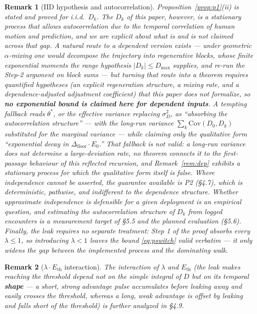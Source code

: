 \documentclass[11pt]{article}
\newtheorem{remark}{Remark}
\newcommand{\Dfloor}{\Delta_{\text{floor}}}
\newcommand{\Eth}{E_{\text{th}}}
\begin{document}
\begin{remark}[IID hypothesis and autocorrelation] \label{rem:iid}
Proposition~\ref{prop:p1}(ii) is stated and proved for i.i.d.\ $D_k$. The $D_k$ of this paper, however, is a stationary process that allows autocorrelation due to the temporal correlation of human motion and prediction, and we are explicit about what is and is not claimed across that gap. A natural route to a dependent version exists --- under geometric $\alpha$-mixing one would decompose the trajectory into regenerative blocks, whose finite exponential moments the range hypothesis $|D_k| \le D_{\max}$ supplies, and re-run the Step-2 argument on block sums --- but turning that route into a theorem requires quantified hypotheses (an explicit regeneration structure, a mixing rate, and a dependence-adjusted adjustment coefficient) that this paper does not formalize, so \textbf{no exponential bound is claimed here for dependent inputs}. A tempting fallback reads $\theta^*$, or the effective variance replacing $\sigma_D^2$, as ``absorbing the autocorrelation structure'' --- with the long-run variance $\sum_k \mathrm{Cov}(D_0, D_k)$ substituted for the marginal variance --- while claiming only the qualitative form ``exponential decay in $\Dfloor \cdot E_0$.'' That fallback is not valid: a long-run variance does not determine a large-deviation rate, no theorem connects it to the first-passage behaviour of this reflected recursion, and Remark~\ref{rem:dep} exhibits a stationary process for which the qualitative form itself is false. Where independence cannot be asserted, the guarantee available is P2 (\S4.7), which is deterministic, pathwise, and indifferent to the dependence structure. Whether approximate independence is defensible for a given deployment is an empirical question, and estimating the autocorrelation structure of $D_k$ from logged encounters is a measurement target of \S5.5 and the planned evaluation (\S5.6). Finally, the leak requires no separate treatment: Step 1 of the proof absorbs every $\lambda \le 1$, so introducing $\lambda < 1$ leaves the bound \eqref{eq:pswitch} valid verbatim --- it only widens the gap between the implemented process and the dominating walk.
\end{remark}

\begin{remark}[$\lambda \cdot \Eth$ interaction]
The interaction of $\lambda$ and $\Eth$ (the leak makes reaching the threshold depend not on the simple integral of $D$ but on its temporal \textbf{shape} --- a short, strong advantage pulse accumulates before leaking away and easily crosses the threshold, whereas a long, weak advantage is offset by leaking and falls short of the threshold) is further analyzed in \S4.9.
\end{remark}
\end{document}
